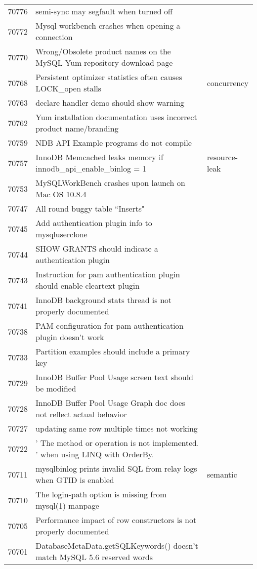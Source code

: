 \begin{longtable}[c]{p{1cm}p{8cm}p{3cm}}
70776 & semi-sync may segfault when turned off &  \\
70772 & Mysql workbench crashes when opening a connection &  \\
70770 & Wrong/Obsolete product names on the MySQL Yum repository download page &  \\
70768 & Persistent optimizer statistics often causes LOCK\_open stalls & concurrency \\
70763 & declare handler demo should show warning &  \\
70762 & Yum installation documentation uses incorrect product name/branding &  \\
70759 & NDB API Example programs do not compile &  \\
70757 & InnoDB Memcached leaks memory if innodb\_api\_enable\_binlog = 1 & resource-leak \\
70753 & MySQLWorkBench crashes upon launch on Mac OS 10.8.4 &  \\
70747 & All round buggy table ``Inserts" &  \\
70745 & Add authentication plugin info to mysqluserclone &  \\
70744 & SHOW GRANTS should indicate a authentication plugin &  \\
70743 & Instruction for pam authentication plugin should enable cleartext plugin &  \\
70741 & InnoDB background stats thread is not properly documented &  \\
70738 & PAM configuration for pam authentication plugin doesn't work &  \\
70733 & Partition examples should include a primary key &  \\
70729 & InnoDB Buffer Pool Usage screen text should be modified &  \\
70728 & InnoDB Buffer Pool Usage Graph doc does not reflect actual behavior &  \\
70727 & updating same row multiple times not working &  \\
70722 & ' The method or operation is not implemented. ' when using LINQ with OrderBy. &  \\
70711 & mysqlbinlog prints invalid SQL from relay logs when GTID is enabled & semantic \\
70710 & The login-path option is missing from mysql(1) manpage &  \\
70705 & Performance impact of row constructors is not properly documented &  \\
70701 & DatabaseMetaData.getSQLKeywords() doesn't match MySQL 5.6 reserved words &  \\

\end{longtable}

